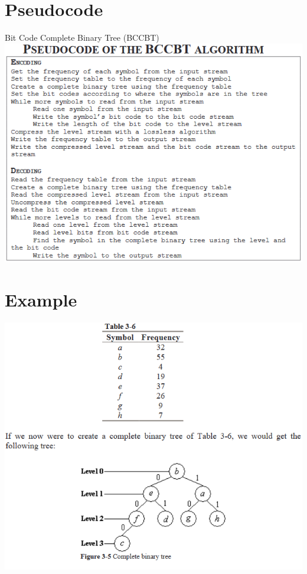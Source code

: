\documentclass{beamer}
\begin{document}
\section{Pseudocode}
\begin{frame}
\begin{center}
Bit Code Complete Binary Tree (BCCBT)
\includegraphics[scale=0.55]{pseudocode}
\end{center}
\end{frame}

\section{Example}
\begin{frame}
\begin{center}
\includegraphics[scale=0.55]{example}
\end{center}
\end{frame}
\end{document}
